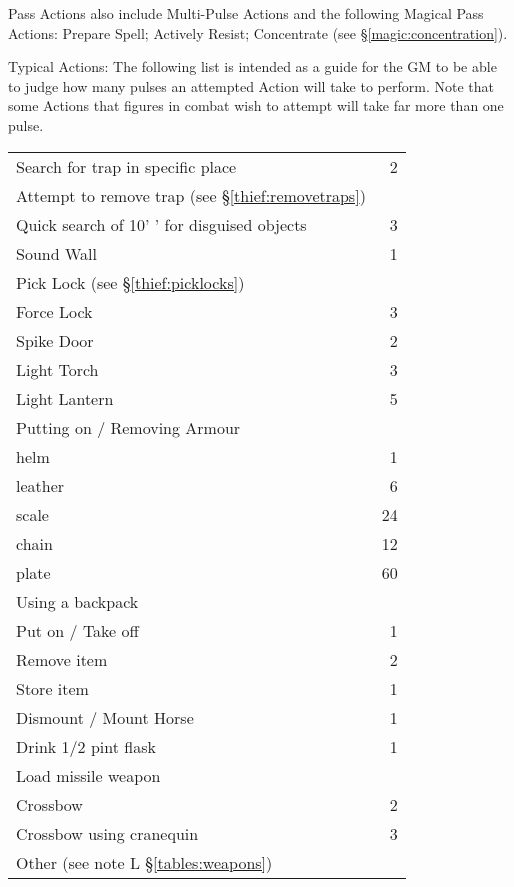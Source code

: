 \begin{multicols*}{3}
Pass Actions also include Multi-Pulse Actions and the following
Magical Pass Actions: Prepare Spell; Actively Resist; Concentrate (see
\S \ref{magic:concentration}).

Typical Actions: The following list is intended as a guide for the GM
to be able to judge how many pulses an attempted Action will take to
perform.  Note that some Actions that figures in combat wish to
attempt will take far more than one pulse.

\begin{tabularx}{\linewidth}{Xr}
Search for trap in specific place	& 2 \\
Attempt to remove trap (see \S\ref{thief:removetraps})	&  \\
Quick search of 10' \x 10' for disguised objects & 3 \\
Sound Wall				& 1 \\
Pick Lock (see \S\ref{thief:picklocks})	&  \\
Force Lock				& 3 \\
Spike Door				& 2 \\
Light Torch				& 3 \\
Light Lantern				& 5 \\
Putting on / Removing Armour		& \\
\hspace{1em}helm			& 1 \\
\hspace{1em}leather			& 6 \\
\hspace{1em}scale			& 24 \\
\hspace{1em}chain			& 12 \\
\hspace{1em}plate			& 60 \\
Using a backpack			& \\
\hspace{1em}Put on / Take off 		& 1 \\
\hspace{1em}Remove item			& 2 \\
\hspace{1em}Store item			& 1 \\
Dismount / Mount Horse			& 1 \\
Drink 1/2 pint flask			& 1 \\
Load missile weapon			& \\
\hspace{1em}Crossbow			& 2 \\
\hspace{1em}Crossbow using cranequin	& 3 \\
\hspace{1em}Other (see note L \S\ref{tables:weapons}) &  \\
\end{tabularx}


\end{multicols*}
